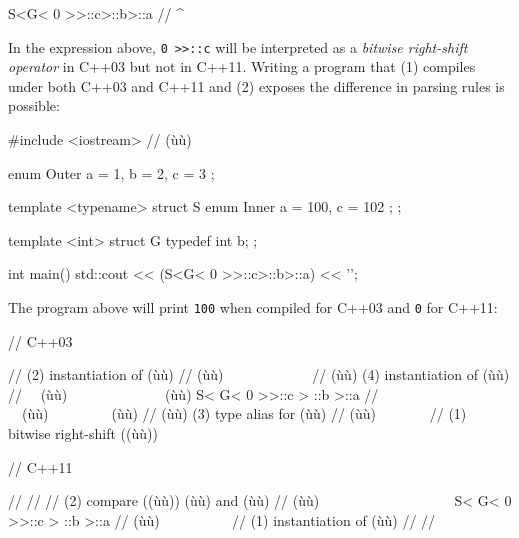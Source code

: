 \begin{emcppslisting}[emcppsignore={Pathological}]
S<G< 0 >>::c>::b>::a
//   ^~~~~~~
\end{emcppslisting}

\noindent In the expression above, \lstinline!0!~\lstinline!>>::c! will be interpreted
as a \emph{bitwise right-shift operator} in C++03 but not in C++11. Writing a program that (1) compiles under both C++03 and
C++11 and (2) exposes the difference in parsing rules is possible:

\begin{emcppshiddenlisting}[emcppsbatch=e4]
#include <iostream>    // (ù{}ù)
\end{emcppshiddenlisting}
\begin{emcppslisting}[emcppsbatch=e4]
enum Outer { a = 1, b = 2, c = 3 };

template <typename> struct S
{
    enum Inner { a = 100, c = 102 };
};

template <int> struct G
{
    typedef int b;
};

int main()
{
    std::cout << (S<G< 0 >>::c>::b>::a) << '\n';
}
\end{emcppslisting}

\noindent The program above will print \lstinline!100! when compiled for C++03 and
\lstinline!0! for C++11:

\begin{emcppslisting}[emcppsignore={Pathological}]
// C++03

//     (2) instantiation of (ù{}ù)
//    (ù{\codeincomments{$\|$}}ù)~~~~~~~~~~~~
//    (ù{\codeincomments{$\|\:\,|\:\,\|$}}ù)   (4) instantiation of (ù{}ù)
//  ~~(ù{\codeincomments{$\|\downarrow\|$}}ù)~~~~~~~~~~~~~~(ù{\codeincomments{$\downarrow$}}ù)
    S< G< 0 >>::c > ::b >::a
//    ~~(ù{\codeincomments{$\|\,\,\uparrow\,\,\|$}}ù)~~~~~~~~~(ù{\codeincomments{$\uparrow$}}ù)
//      (ù{\codeincomments{$\|\:\,\,\,|\:\,\,\,\|$}}ù) (3) type alias for (ù{}ù)
//      (ù{\codeincomments{$\|$}}ù)~~~~~~~
// (1) bitwise right-shift ((ù{}ù))
\end{emcppslisting}


\begin{emcppslisting}[emcppsignore={Pathological}]
// C++11

//
//
//  (2) compare ((ù{\codeincomments{>}}ù)) (ù{}ù) and (ù{}ù)
//  (ù{\codeincomments{$\downarrow$}}ù) ~~~~~~~~~~~~~~~~~~
    S< G< 0 >>::c > ::b >::a
//  (ù{\codeincomments{$\uparrow$}}ù) ~~~~~~~~~
//  (1) instantiation of (ù{}ù)
//
//
\end{emcppslisting}

